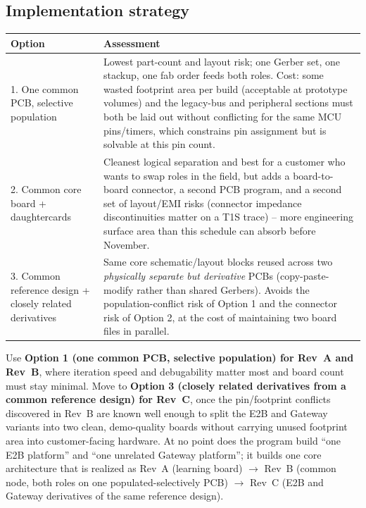 \subsection{Implementation strategy}

\begin{center}
\small
\begin{tabularx}{\linewidth}{@{}p{3.2cm} X@{}}
\toprule
\textbf{Option} & \textbf{Assessment} \\
\midrule
1. One common PCB, selective population & Lowest part-count and layout risk; one Gerber set, one stackup, one fab order feeds both roles. Cost: some wasted footprint area per build (acceptable at prototype volumes) and the legacy-bus and peripheral sections must both be laid out without conflicting for the same MCU pins/timers, which constrains pin assignment but is solvable at this pin count. \\
2. Common core board + daughtercards & Cleanest logical separation and best for a customer who wants to swap roles in the field, but adds a board-to-board connector, a second PCB program, and a second set of layout/EMI risks (connector impedance discontinuities matter on a T1S trace) -- more engineering surface area than this schedule can absorb before November. \\
3. Common reference design + closely related derivatives & Same core schematic/layout blocks reused across two \emph{physically separate but derivative} PCBs (copy-paste-modify rather than shared Gerbers). Avoids the population-conflict risk of Option 1 and the connector risk of Option 2, at the cost of maintaining two board files in parallel. \\
\bottomrule
\end{tabularx}
\end{center}

\begin{decision}[title={Recommendation}]
Use \textbf{Option 1 (one common PCB, selective population) for Rev~A and Rev~B}, where iteration speed and debugability matter most and board count must stay minimal. Move to \textbf{Option 3 (closely related derivatives from a common reference design) for Rev~C}, once the pin/footprint conflicts discovered in Rev~B are known well enough to split the E2B and Gateway variants into two clean, demo-quality boards without carrying unused footprint area into customer-facing hardware. At no point does the program build ``one E2B platform'' and ``one unrelated Gateway platform''; it builds one core architecture that is realized as Rev~A (learning board) $\rightarrow$ Rev~B (common node, both roles on one populated-selectively PCB) $\rightarrow$ Rev~C (E2B and Gateway derivatives of the same reference design).
\end{decision}
